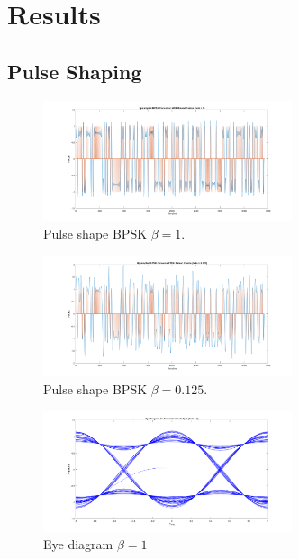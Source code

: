 \documentclass{article}
\begin{document}

\section{Results}

\subsection{Pulse Shaping}

\begin{figure}[h]
  \begin{center}
    \includegraphics[width=0.65\textwidth]{img/upsampled_bpsk_raised_cosine_beta_1.png}
    \caption{Pulse shape BPSK $\beta = 1$.}
  \end{center}
\end{figure}

\begin{figure}[h]
  \begin{center}
    \includegraphics[width=0.65\textwidth]{img/upsampled_bpsk_raised_cosine_beta_125.png}
    \caption{Pulse shape BPSK $\beta = 0.125$.}
  \end{center}
\end{figure}

\begin{figure}[h]
  \begin{center}
    \includegraphics[width=0.65\textwidth]{img/eye_diagram_beta_1.png}
    \caption{Eye diagram $\beta = 1$}
  \end{center}
\end{figure}
\end{document}

